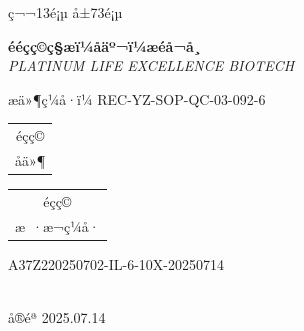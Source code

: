 \documentclass[UTF8,10pt,a4paper,fontset=fandol]{ctexart}
\newcommand{\fieldvalue}[1]{#1}
\newcommand{\handwritten}[1]{#1}
\begin{document}
ç¬¬13é¡µ å±73é¡µ

\newpage

\begin{center}
\textbf{ééçç©ç§æï¼åäº¬ï¼æéå¬å¸}\\
\textit{PLATINUM LIFE EXCELLENCE BIOTECH}
\end{center}

\begin{flushright}
æä»¶ç¼å·ï¼
\fieldvalue{REC-YZ-SOP-QC-03-092-6}
\end{flushright}

\begin{center}
\begin{tabular}{|c|}
\hline
éçç©\\
\handwritten{åä»¶}\\
\hline
\end{tabular}
\qquad
\begin{tabular}{|c|}
\hline
éçç©\\
æ ·æ¬ç¼å·\\
\hline
\end{tabular}
\end{center}

\begin{center}
\fieldvalue{A37Z220250702-IL-6-10X-20250714}
\end{center}

\begin{center}
\\[2pt]
\handwritten{å®éª 2025.07.14}
\end{center}
\end{document}
